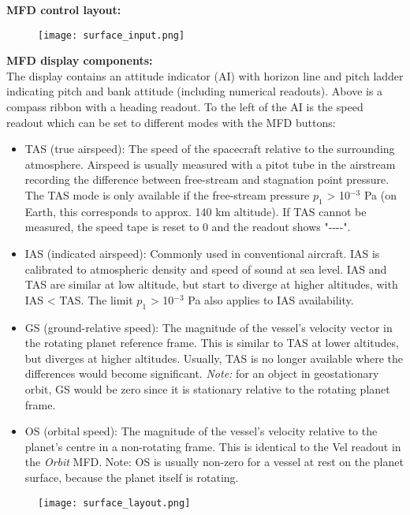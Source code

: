 \documentclass[Orbiter User Manual.tex]{subfiles}
\begin{document}
\noindent
\textbf{MFD control layout:}

\begin{figure}[H]
  \centering
  \texttt{[image: surface\_input.png]}
\end{figure}

\noindent
\textbf{MFD display components:}\\
The display contains an attitude indicator (AI) with horizon line and pitch ladder indicating pitch and bank attitude (including numerical readouts). Above is a compass ribbon with a heading readout. To the left of the AI is the speed readout which can be set to different modes with the MFD buttons:

\begin{itemize}
\item TAS (true airspeed): The speed of the spacecraft relative to the surrounding atmosphere. Airspeed is usually measured with a pitot tube in the airstream recording the difference between free-stream and stagnation point pressure. The TAS mode is only available if the free-stream pressure $p_{1}$ > 10$^{-3}$ Pa (on Earth, this corresponds to approx. 140 km altitude). If TAS cannot be measured, the speed tape is reset to 0 and the readout shows "-{}-{}-{}-".
\item IAS (indicated airspeed): Commonly used in conventional aircraft. IAS is calibrated to atmospheric density and speed of sound at sea level. IAS and TAS are similar at low altitude, but start to diverge at higher altitudes, with IAS < TAS. The limit $p_{1}$ > 10$^{-3}$ Pa also applies to IAS availability.
\item GS (ground-relative speed): The magnitude of the vessel's velocity vector in the rotating planet reference frame. This is similar to TAS at lower altitudes, but diverges at higher altitudes. Usually, TAS is no longer available where the differences would become significant. \textit{Note:} for an object in geostationary orbit, GS would be zero since it is stationary relative to the rotating planet frame.
\item OS (orbital speed): The magnitude of the vessel's velocity relative to the planet's centre in a non-rotating frame. This is identical to the Vel readout in the \textit{Orbit} MFD. Note: OS is usually non-zero for a vessel at rest on the planet surface, because the planet itself is rotating.
\end{itemize}

\begin{figure}[H]
  \centering
  \texttt{[image: surface\_layout.png]}
\end{figure}
\end{document}
